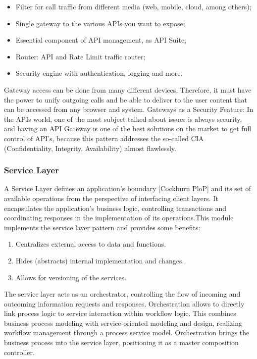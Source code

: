 \begin{itemize}
\item Filter for call traffic from different media (web, mobile, cloud, among others);
\item Single gateway to the various APIs you want to expose;
\item Essential component of API management, as API Suite;
\item Router: API and Rate Limit traffic router;
\item Security engine with authentication, logging and more.
\end{itemize}

Gateway access can be done from many different devices. Therefore, it must have the power to unify outgoing calls and be able to deliver to the user content that can be accessed from any browser and system. Gateways as a Security Feature: In the APIs world, one of the most subject talked about issues is always security, and having an API Gateway is one of the best solutions on the market to get full control of API’s, because this pattern addresses the so-called CIA (Confidentiality, Integrity, Availability) almost flawlessly.

\subsubsection{Service Layer}\label{sec:ServiceLayer}
A Service Layer defines an application's boundary [Cockburn PloP] and its set of available operations from the perspective of interfacing client layers. It encapsulates the application's business logic, controlling transactions and coordinating responses in the implementation of its operations.This module implements the service layer pattern and provides some benefits:

\begin{enumerate}
\item Centralizes external access to data and functions.
\item Hides (abstracts) internal implementation and changes.
\item Allows for versioning of the services.
\end{enumerate}

The service layer acts as an orchestrator, controlling the flow of incoming and outcoming information requests and responses. Orchestration allows to directly link process logic to service interaction within workflow logic. This combines business process modeling with service-oriented modeling and design, realizing workflow management through a process service model. Orchestration brings the business process into the service layer, positioning it as a master composition controller.

